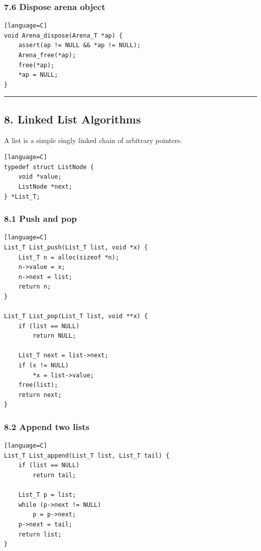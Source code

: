 \documentclass[11pt]{article}
\begin{document}
\subsubsection{7.6 Dispose arena object}\label{dispose-arena-object}

\begin{verbatim}[language=C]
void Arena_dispose(Arena_T *ap) {
    assert(ap != NULL && *ap != NULL);
    Arena_free(*ap);
    free(*ap);
    *ap = NULL;
}
\end{verbatim}

\begin{center}\rule{0.5\linewidth}{0.5pt}\end{center}

\subsection{8. Linked List Algorithms}\label{linked-list-algorithms}

A list is a simple singly linked chain of arbitrary pointers.

\begin{verbatim}[language=C]
typedef struct ListNode {
    void *value;
    ListNode *next;
} *List_T;
\end{verbatim}

\subsubsection{8.1 Push and pop}\label{push-and-pop}

\begin{verbatim}[language=C]
List_T List_push(List_T list, void *x) {
    List_T n = alloc(sizeof *n);
    n->value = x;
    n->next = list;
    return n;
}

List_T List_pop(List_T list, void **x) {
    if (list == NULL)
        return NULL;

    List_T next = list->next;
    if (x != NULL)
        *x = list->value;
    free(list);
    return next;
}
\end{verbatim}

\subsubsection{8.2 Append two lists}\label{append-two-lists}

\begin{verbatim}[language=C]
List_T List_append(List_T list, List_T tail) {
    if (list == NULL)
        return tail;

    List_T p = list;
    while (p->next != NULL)
        p = p->next;
    p->next = tail;
    return list;
}
\end{verbatim}
\end{document}
